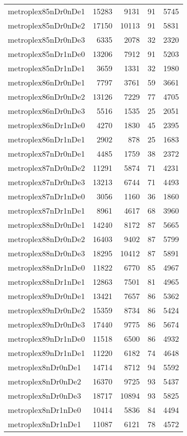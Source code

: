 \begin{longtable}{lrrrr}
metroplex85nDr0nDe1 & 15283 & 9131 & 91 & 5745 \\
metroplex85nDr0nDe2 & 17150 & 10113 & 91 & 5831 \\
metroplex85nDr0nDe3 & 6335 & 2078 & 32 & 2320 \\
metroplex85nDr1nDe0 & 13206 & 7912 & 91 & 5203 \\
metroplex85nDr1nDe1 & 3659 & 1331 & 32 & 1980 \\
metroplex86nDr0nDe1 & 7797 & 3761 & 59 & 3661 \\
metroplex86nDr0nDe2 & 13126 & 7229 & 77 & 4705 \\
metroplex86nDr0nDe3 & 5516 & 1535 & 25 & 2051 \\
metroplex86nDr1nDe0 & 4270 & 1830 & 45 & 2395 \\
metroplex86nDr1nDe1 & 2902 & 878 & 25 & 1683 \\
metroplex87nDr0nDe1 & 4485 & 1759 & 38 & 2372 \\
metroplex87nDr0nDe2 & 11291 & 5874 & 71 & 4231 \\
metroplex87nDr0nDe3 & 13213 & 6744 & 71 & 4493 \\
metroplex87nDr1nDe0 & 3056 & 1160 & 36 & 1860 \\
metroplex87nDr1nDe1 & 8961 & 4617 & 68 & 3960 \\
metroplex88nDr0nDe1 & 14240 & 8172 & 87 & 5665 \\
metroplex88nDr0nDe2 & 16403 & 9402 & 87 & 5799 \\
metroplex88nDr0nDe3 & 18295 & 10412 & 87 & 5891 \\
metroplex88nDr1nDe0 & 11822 & 6770 & 85 & 4967 \\
metroplex88nDr1nDe1 & 12863 & 7501 & 81 & 4965 \\
metroplex89nDr0nDe1 & 13421 & 7657 & 86 & 5362 \\
metroplex89nDr0nDe2 & 15359 & 8734 & 86 & 5424 \\
metroplex89nDr0nDe3 & 17440 & 9775 & 86 & 5674 \\
metroplex89nDr1nDe0 & 11518 & 6500 & 86 & 4932 \\
metroplex89nDr1nDe1 & 11220 & 6182 & 74 & 4648 \\
metroplex8nDr0nDe1 & 14714 & 8712 & 94 & 5592 \\
metroplex8nDr0nDe2 & 16370 & 9725 & 93 & 5437 \\
metroplex8nDr0nDe3 & 18717 & 10894 & 93 & 5825 \\
metroplex8nDr1nDe0 & 10414 & 5836 & 84 & 4494 \\
metroplex8nDr1nDe1 & 11087 & 6121 & 78 & 4572 \\

\end{longtable}

